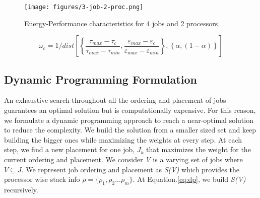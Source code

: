 \begin{figure}[]
	\texttt{[image: figures/3-job-2-proc.png]}
	\caption{Energy-Performance characteristics for 4 jobs and 2 processors} 
	\label{fig:3-jobs}
\end{figure}



\begin{equation}
\omega_{c}=1/dist\left [\left \{\frac{\tau_{max} - \tau_{c}}{\tau_{max} - \tau_{min}},\frac{\varepsilon_{max} - \varepsilon_{c}}{\varepsilon_{max} - \varepsilon_{min}}\right \}, \left \{\alpha,(1- \alpha)\right \}\right ]
\label{eq:weight}
\end{equation}


\subsection{Dynamic Programming Formulation}
An exhaustive search throughout all the ordering and placement of jobs guarantees an optimal solution but is computationally 
expensive.
For this reason, we formulate a dynamic programming approach to reach a near-optimal solution to reduce the complexity. We 
build the solution from a smaller
sized set and keep building the bigger ones while maximizing the weights at every step. At each step, we find a new placement
for one job, ${J_k}$ that maximizes the weight for the current ordering and placement. We consider \emph{V} is a varying
set of jobs where ${V} \subseteq {J}$. We represent job ordering and placement as \emph{S(V)} which provides the processor
wise stack info $\rho = \{\rho_1, \rho_2 ... \rho_m\}$. At Equation.\ref{eq:dp}, we build \emph{S(V)} recursively.

